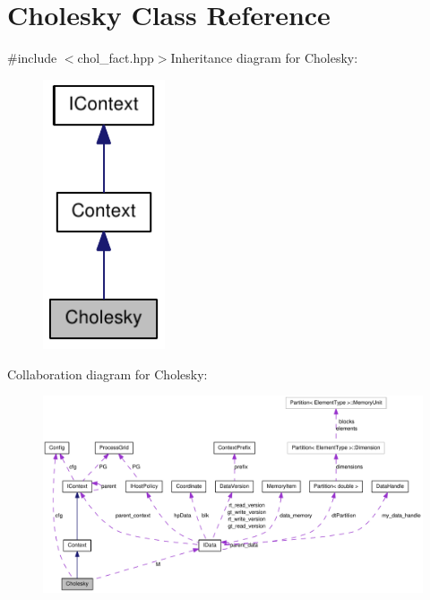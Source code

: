 \hypertarget{class_cholesky}{
\section{Cholesky Class Reference}
\label{class_cholesky}
}


{\ttfamily \#include $<$chol\_\-fact.hpp$>$}Inheritance diagram for Cholesky:\nopagebreak
\begin{figure}[H]
\begin{center}
\leavevmode
\includegraphics[width=102pt]{class_cholesky__inherit__graph}
\end{center}
\end{figure}
Collaboration diagram for Cholesky:\nopagebreak
\begin{figure}[H]
\begin{center}
\leavevmode
\includegraphics[width=400pt]{class_cholesky__coll__graph}
\end{center}
\end{figure}
